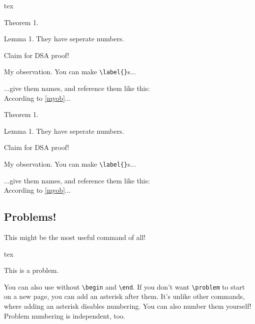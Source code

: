 \documentclass{fhw}
\begin{document}
\begin{Code}{tex}
\begin{theorem}
  Theorem 1. \blindtext
\end{theorem}

\begin{lemma}
  Lemma 1. They have seperate numbers.
\end{lemma}

\begin{claim}
  Claim for DSA proof!
\end{claim}

\begin{observation}
  My observation. You can make \verb|\label{}|s...
  \label{myob}
\end{observation}

\begin{lemma}[My lemma]
  ...give them names, and reference them like this:\\
  According to \cref{myob}...
\end{lemma}
\end{Code}

\begin{theorem}
	Theorem 1. \blindtext
\end{theorem}

\begin{lemma}
	Lemma 1. They have seperate numbers.
\end{lemma}

\begin{claim}
  Claim for DSA proof!
\end{claim}

\begin{observation}
  My observation. You can make \verb|\label{}|s...
	\label{myob}
\end{observation}

\begin{lemma}[My lemma]
	...give them names, and reference them like this:\\
	According to \cref{myob}...
\end{lemma}

\subsection{Problems!}

This might be the most useful command of all!
\begin{Code}{tex}
\begin{problem}
  This is a problem.
\end{problem}
\problem You can also use without \verb|\begin| and \verb|\end|.
\problem* If you don't want \verb|\problem| to start on a new page, you can add an asterisk after them. It's unlike other commands, where adding an asterisk disables numbering.
\problem*[C8763 --- Starburst] You can also number them yourself!
\problem* Problem numbering is independent, too.
\end{Code}
\end{document}
